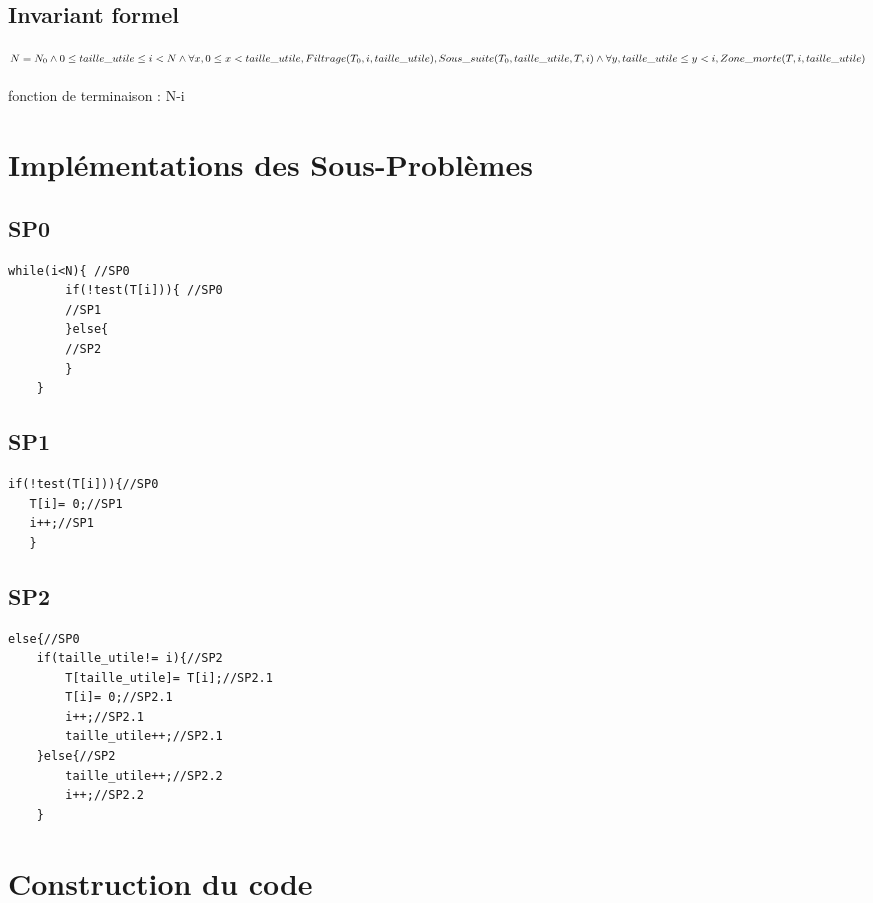 \documentclass[a4paper, 11pt, oneside]{article}
\begin{document}
\subsection{Invariant formel}
$N = N_{0} 
\\ \land 0 \leq taille\_utile \leq i < N
\\ \land \forall x, 0 \leq x<taille\_utile, Filtrage(T_{0}, i, taille\_utile), Sous\_suite(T_0, taille\_utile, T, i) 
\\ \land \forall y, taille\_utile \leq y<i, Zone\_morte(T, i, taille\_utile) $
\\
\\
fonction de terminaison : N-i
\section{Implémentations des Sous-Problèmes}
\subsection{SP0}
\begin{lstlisting}
while(i<N){ //SP0
        if(!test(T[i])){ //SP0
        //SP1
        }else{
        //SP2
        }
    }
\end{lstlisting}
\subsection{SP1}
\begin{lstlisting}
if(!test(T[i])){//SP0
   T[i]= 0;//SP1
   i++;//SP1
   }
\end{lstlisting}

\subsection{SP2}
\begin{lstlisting}
else{//SP0
    if(taille_utile!= i){//SP2
        T[taille_utile]= T[i];//SP2.1
        T[i]= 0;//SP2.1
        i++;//SP2.1
        taille_utile++;//SP2.1
    }else{//SP2
        taille_utile++;//SP2.2
        i++;//SP2.2
    }
\end{lstlisting}


\section{Construction du code}
\end{document}
